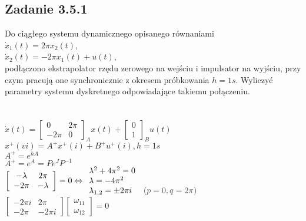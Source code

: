 \pagebreak
\subsection*{Zadanie 3.5.1} {\color{darkgray}
	Do ciągłego systemu dynamicznego opisanego równaniami\\
	$\dot{x}_1(t)=2\pi x_2(t)$,\\
	$\dot{x}_2(t)=-2 \pi x_1(t)+u(t)$,\\
	podłączono ekstrapolator rzędu zerowego na wejściu i impulsator na wyjściu, przy czym pracują one synchronicznie z okresem próbkowania $h = 1 s$. Wyliczyć parametry systemu dyskretnego odpowiadające takiemu połączeniu.\\
}\lineh
\\\\
$\dot{x}(t)=\left[ \begin{array}{cc}     0&2\pi\\-2\pi&0    \end{array}\right]_Ax(t)+\left[ \begin{array}{c}     0\\1    \end{array}\right]_Bu(t)$\\
$x^+(vi)=A^+x^+(i)+B^+u^+(i), h=1s$\\
$A^+=e^{hA}$\\
$A^+=e^{A}=Pe^JP^{-1}$\\
$\left[ \begin{array}{cc}     -\lambda&2\pi\\-2\pi&-\lambda    \end{array}\right]=0 \Leftrightarrow \begin{array}{l}\lambda^2+4\pi^2=0 \\ \lambda=-4\pi^2 \\ \lambda_{1,2}=\pm 2\pi i\end{array} \begin{array}{l} \\ \\{\color{darkgray} (p=0, q=2\pi)} \end{array}$\\
$\left[ \begin{array}{cc}     -2\pi i& \boxed{2\pi } \\-2\pi&-2\pi i    \end{array}\right]
\left[ \begin{array}{c}   \omega_{11}  \\ \omega_{12}   \end{array}\right] =0$\\
